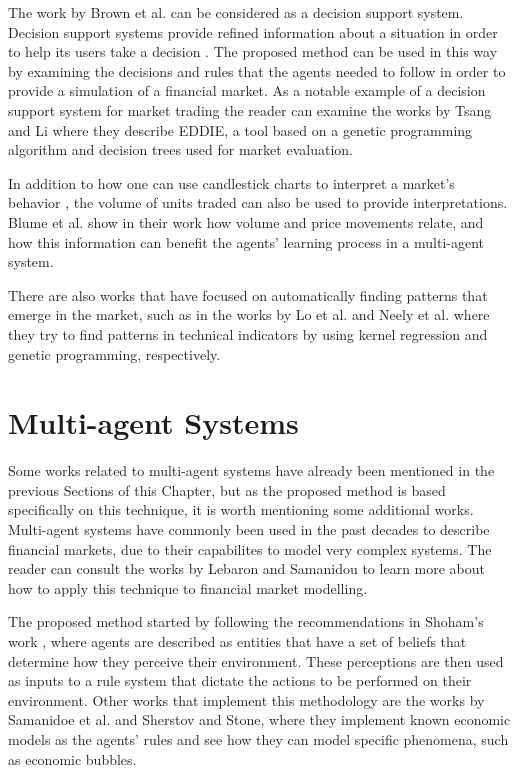 The work by Brown et al. can be considered as a decision support
system. Decision support systems provide refined information about a situation
in order to help its users take a decision \cite{Keen1980}. The proposed method
can be used in this way by examining the decisions and rules that the agents
needed to follow in order to provide a simulation of a financial market. As a
notable example of a decision support system for market trading the reader can
examine the works by Tsang and Li \cite{Tsang2004} \cite{tsang1998eddie} where
they describe EDDIE, a tool based on a genetic programming algorithm and
decision trees used for market evaluation.

In addition to how one can use candlestick charts to interpret a market's
behavior \cite{Nison1991}, the volume of units traded can also be used to
provide interpretations. Blume et al. \cite{Blume1994} show in their work how
volume and price movements relate, and how this information can benefit the
agents' learning process in a multi-agent system.

There are also works that have focused on automatically finding patterns that
emerge in the market, such as in the works by Lo et al. \cite{Lo2000} and Neely
et al. \cite{Neely1997} where they try to find patterns in technical indicators
by using kernel regression and genetic programming, respectively.

\section{Multi-agent Systems}
\label{section:multi-agent-systems}

Some works related to multi-agent systems have already been mentioned in the
previous Sections of this Chapter, but as the proposed method is based
specifically on this technique, it is worth mentioning some additional
works. Multi-agent systems have commonly been used in the past decades to
describe financial markets, due to their capabilites to model very complex
systems. The reader can consult the works by Lebaron \cite{Lebaron2001} and
Samanidou \cite{Bundesbank2007} to learn more about how to apply this technique
to financial market modelling.

The proposed method started by following the recommendations in Shoham's work
\cite{Shoham1993} \cite{Shoham2009}, where agents are described as entities that
have a set of beliefs that determine how they perceive their environment. These
perceptions are then used as inputs to a rule system that dictate the actions
to be performed on their environment. Other works that implement this
methodology are the works by Samanidoe et al. \cite{Bundesbank2007} and Sherstov
and Stone\cite{Sherstov2005}, where they implement known economic models as the
agents' rules and see how they can model specific phenomena, such as economic
bubbles.

